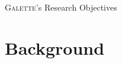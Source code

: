 \documentclass[aspectratio=169,xcolor={dvipsnames}
]{beamer}
\newcommand{\ourtech}{\textsc{Galette}}
\begin{document}
\begin{frame}{\ourtech{}'s Research Objectives}
\end{frame}

\section{Background}

\end{document}

